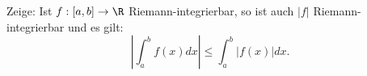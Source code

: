 \begin{prob}
Zeige: Ist $f:[a,b]\to\R$ Riemann-integrierbar, so ist auch $|f|$
Riemann-integrierbar und es gilt:
$$
|\int_a^bf(x)dx| \leq \int_a^b|f(x)|dx.
$$

\end{prob}
